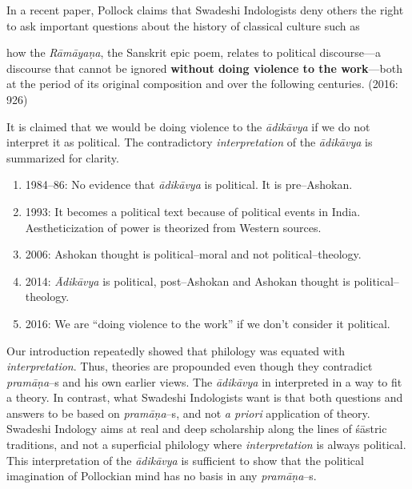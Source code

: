 \newpage

In a recent paper, Pollock claims that Swadeshi Indologists deny others the right to ask important questions about the history of classical culture such as

\begin{myquote}
how the \textit{Rāmāyaṇa}, the Sanskrit epic poem, relates to political discourse—a discourse that cannot be ignored \textbf{without doing violence to the work}—both at the period of its original composition and over the following centuries. (2016: 926)
\end{myquote}

It is claimed that we would be doing violence to the \textit{ādikāvya} if we do not interpret it as political. The contradictory \textit{interpretation} of the \textit{ādikāvya }is summarized for clarity.

\begin{enumerate}
\itemsep=0pt
\item 1984–86: No evidence that \textit{ādikāvya }is political. It is pre–Ashokan.

 \item 1993: It becomes a political text because of political events in India. Aestheticization of power is theorized from Western sources.

 \item 2006: Ashokan thought is political–moral and not political–theology.

 \item 2014: \textit{Ādikāvya }is political, post–Ashokan and Ashokan thought is political–theology.

 \item 2016: We are “doing violence to the work” if we don’t consider it political.

\end{enumerate}

Our introduction repeatedly showed that philology was equated with \textit{interpretation}. Thus, theories are propounded even though they contradict\textit{ pramāṇa}–s and his own earlier views. The\textit{ ādikāvya} in interpreted in a way to fit a theory. In contrast, what Swadeshi Indologists want is that both questions and answers to be based on \textit{pramāṇa}–s, and not \textit{a priori} application of theory. Swadeshi Indology aims at real and deep scholarship along the lines of śāstric traditions, and not a superficial philology where \textit{interpretation} is always political. This interpretation of the \textit{ādikāvya }is sufficient to show that the political imagination of Pollockian mind has no basis in any \textit{pramāṇa}–s.

